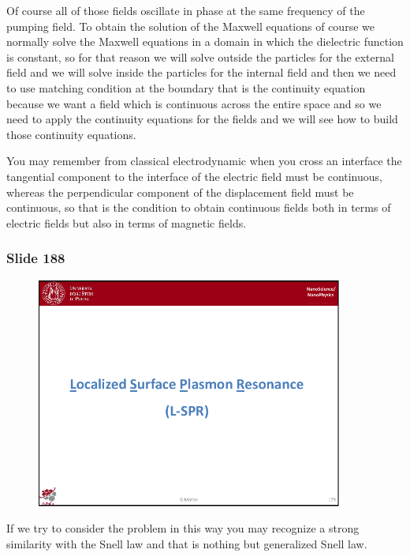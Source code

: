 \documentclass[../main/main.tex]{subfiles}
\begin{document}
Of course all of those fields oscillate in phase at the same frequency of the pumping field. To obtain the solution of the Maxwell equations of course we normally solve the Maxwell equations in a domain in which the dielectric function is constant, so for that reason we will solve outside the particles for the external field and we will solve inside the particles for the internal field and then we need to use matching condition at the boundary that is the continuity equation because we want a field which is continuous across the entire space and so we need to apply the continuity equations for the fields and we will see how to build those continuity equations. 

You may remember from classical electrodynamic when you cross an interface the tangential component to the interface of the electric field must be continuous, whereas the perpendicular component of the displacement field must be continuous, so that is the condition to obtain continuous fields both in terms of electric fields but also in terms of magnetic fields.

\newpage

\subsubsection{Slide 188}

\begin{figure}[h!]
\centering
\includegraphics[page=10,width=0.9\textwidth]{../lessons/pdf_file/11_lesson.pdf}
\end{figure}

If we try to consider the problem in this way you may recognize a strong similarity with  the Snell law and that is nothing but generalized Snell law.
\end{document}
